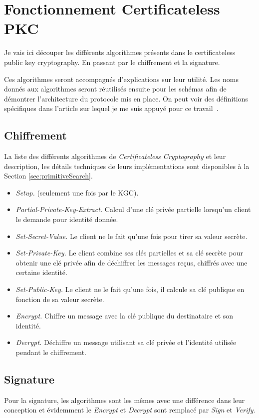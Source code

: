 \section{Fonctionnement Certificateless PKC}
Je vais ici découper les différents algorithmes présents dans le certificateless public key cryptography. En passant par le chiffrement et la signature.

Ces algorithmes seront accompagnés d'explications sur leur utilité. Les noms donnés aux algorithmes seront réutilisés ensuite pour les schémas afin de démontrer l'architecture du protocole mis en place. On peut voir des définitions spécifiques dans l'article sur lequel je me suis appuyé pour ce travail~\cite{conf/pkc/DentLP08}.
\subsection{Chiffrement}
La liste des différents algorithmes de \textit{Certificateless Cryptography} et leur description, les détails techniques de leurs implémentations sont disponibles à la Section \ref{sec:primitiveSearch}.
\begin{itemize}
	\item \textit{Setup.} (seulement une fois par le KGC).
	\item \textit{Partial-Private-Key-Extract.} Calcul d'une clé privée partielle lorsqu'un client le demande pour identité donnée.
	\item \textit{Set-Secret-Value.} Le client ne le fait qu'une fois pour tirer sa valeur secrète.
	\item \textit{Set-Private-Key.} Le client combine ses clés partielles et sa clé secrète pour obtenir une clé privée afin de déchiffrer les messages reçus, chiffrés avec une certaine identité.
	\item \textit{Set-Public-Key.} Le client ne le fait qu'une fois, il calcule sa clé publique en fonction de sa valeur secrète.
	\item \textit{Encrypt.} Chiffre un message avec la clé publique du destinataire et son identité.
	\item \textit{Decrypt.} Déchiffre un message utilisant sa clé privée et l'identité utilisée pendant le chiffrement.
\end{itemize}
\subsection{Signature}
Pour la signature, les algorithmes sont les mêmes avec une différence dans leur conception et évidemment le \textit{Encrypt} et \textit{Decrypt} sont remplacé par \textit{Sign} et \textit{Verify}.

